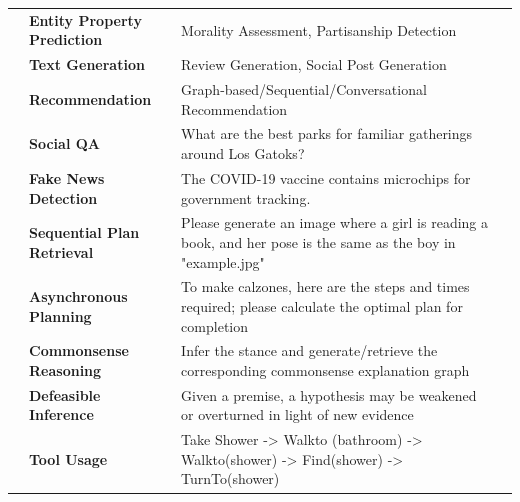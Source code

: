\begin{table}[ht!]
{\begin{adjustbox}{angle=90}
\begin{tabular}{lp{4.5cm}p{15cm}p{7cm}
    }
    \midrule
     & \textbf{Entity Property Prediction} & Morality Assessment, Partisanship Detection & \cite{jiang2023social, wang2024knowledge2} \\
    & \textbf{Text Generation} & Review Generation, Social Post Generation & \cite{ahmed2018learning, wang2024augmenting, kim2020retrieval, xie2023factual, sharma2018cyclegen, dong2017learning, park2015retrieval} \\
    & \textbf{Recommendation} & Graph-based/Sequential/Conversational Recommendation & \cite{du2024large, wei2024llmrec, wang2024knowledge2, huang2021graph, zeng2024federated, wang2023zero, qiu2020exploiting, hou2024large, friedman2023leveraging} \\
    & \textbf{Social QA} & What are the best parks for familiar gatherings around Los Gatoks? & \cite{zeng2024large, kemper2024retrieval, wu2024stark} \\
    & \textbf{Fake News Detection} & The COVID-19 vaccine contains microchips for government tracking. & \cite{ram2024credirag, li2024re} \\
    \midrule
     & \textbf{Sequential Plan Retrieval} & Please generate an image where a girl is reading a book, and her pose is the same as the boy in "example.jpg" & \cite{shen2024hugginggpt, shen2023taskbench, song2023restgpt, wu2024can, zhao2024large} \\
    & \textbf{Asynchronous Planning} & To make calzones, here are the steps and times required; please calculate the optimal plan for completion & \cite{lin2024graph} \\
    & \textbf{Commonsense Reasoning} & Infer the stance and generate/retrieve the corresponding commonsense explanation graph & \cite{saha2021explagraphs} \\
    & \textbf{Defeasible Inference} & Given a premise, a hypothesis may be weakened or overturned in light of new evidence & \cite{madaan2021could} \\
    & \textbf{Tool Usage} & Take Shower -> Walkto (bathroom) -> Walkto(shower) -> Find(shower) -> TurnTo(shower) & \cite{zhuang2023toolchain, hao2023reasoning} \\

\end{tabular}
\end{adjustbox}}
\end{table}
